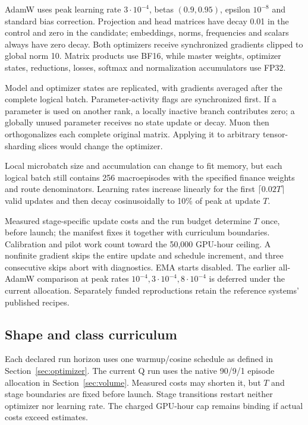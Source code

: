 \documentclass[11pt]{article}
\begin{document}
AdamW uses peak learning rate $3\cdot10^{-4}$, betas $(0.9,0.95)$, epsilon $10^{-8}$ and standard bias correction. Projection and head matrices have decay 0.01 in the control and zero in the candidate; embeddings, norms, frequencies and scalars always have zero decay. Both optimizers receive synchronized gradients clipped to global norm 10. Matrix products use BF16, while master weights, optimizer states, reductions, losses, softmax and normalization accumulators use FP32.

Model and optimizer states are replicated, with gradients averaged after the complete logical batch. Parameter-activity flags are synchronized first. If a parameter is used on another rank, a locally inactive branch contributes zero; a globally unused parameter receives no state update or decay. Muon then orthogonalizes each complete original matrix. Applying it to arbitrary tensor-sharding slices would change the optimizer.

Local microbatch size and accumulation can change to fit memory, but each logical batch still contains 256 macroepisodes with the specified finance weights and route denominators. Learning rates increase linearly for the first $\lceil0.02T\rceil$ valid updates and then decay cosinusoidally to 10\% of peak at update $T$.

Measured stage-specific update costs and the run budget determine $T$ once, before launch; the manifest fixes it together with curriculum boundaries. Calibration and pilot work count toward the 50,000 GPU-hour ceiling. A nonfinite gradient skips the entire update and schedule increment, and three consecutive skips abort with diagnostics. EMA starts disabled. The earlier all-AdamW comparison at peak rates $10^{-4},3\cdot10^{-4},8\cdot10^{-4}$ is deferred under the current allocation. Separately funded reproductions retain the reference systems' published recipes.

\subsection{Shape and class curriculum}
\label{sec:curriculum}

Each declared run horizon uses one warmup/cosine schedule as defined in Section~\ref{sec:optimizer}. The current Q run uses the native 90/9/1 episode allocation in Section~\ref{sec:volume}. Measured costs may shorten it, but $T$ and stage boundaries are fixed before launch. Stage transitions restart neither optimizer nor learning rate. The charged GPU-hour cap remains binding if actual costs exceed estimates.
\end{document}
